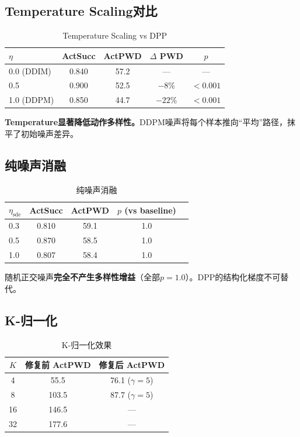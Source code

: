 \documentclass[11pt]{article}
\begin{document}
\subsection{Temperature Scaling对比}

\begin{table}[h]
\centering
\caption{Temperature Scaling vs DPP}
\begin{tabular}{lcccc}
\toprule
$\eta$ & ActSucc & ActPWD & $\Delta$ PWD & $p$ \\
\midrule
0.0 (DDIM) & 0.840 & 57.2 & --- & --- \\
0.5 & 0.900 & 52.5 & $-8\%$ & $<0.001$ \\
1.0 (DDPM) & 0.850 & 44.7 & \textbf{$-22\%$} & $<0.001$ \\
\bottomrule
\end{tabular}
\end{table}

\textbf{Temperature显著降低动作多样性。}DDPM噪声将每个样本推向“平均”路径，抹平了初始噪声差异。

\subsection{纯噪声消融}

\begin{table}[h]
\centering
\caption{纯噪声消融}
\begin{tabular}{lcccc}
\toprule
$\eta_{\text{sde}}$ & ActSucc & ActPWD & $p$ (vs baseline) \\
\midrule
0.3 & 0.810 & 59.1 & 1.0 \\
0.5 & 0.870 & 58.5 & 1.0 \\
1.0 & 0.807 & 58.4 & 1.0 \\
\bottomrule
\end{tabular}
\end{table}

随机正交噪声\textbf{完全不产生多样性增益}（全部$p=1.0$）。DPP的结构化梯度不可替代。

\subsection{K-归一化}

\begin{table}[h]
\centering
\caption{K-归一化效果}
\begin{tabular}{ccc}
\toprule
$K$ & 修复前 ActPWD & 修复后 ActPWD \\
\midrule
4 & 55.5 & 76.1 ($\gamma{=}5$) \\
8 & 103.5 & 87.7 ($\gamma{=}5$) \\
16 & 146.5 & --- \\
32 & 177.6 & --- \\
\bottomrule
\end{tabular}
\end{table}
\end{document}
